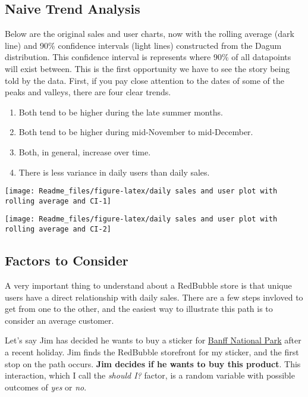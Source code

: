 \documentclass[]{article}
\providecommand{\tightlist}{%
  \setlength{\itemsep}{0pt}\setlength{\parskip}{0pt}}
\begin{document}
\subsection{Naive Trend Analysis}\label{naive-trend-analysis}

Below are the original sales and user charts, now with the rolling
average (dark line) and 90\% confidence intervals (light lines)
constructed from the Dagum distribution. This confidence interval is
represents where 90\% of all datapoints will exist between. This is the
first opportunity we have to see the story being told by the data.
First, if you pay close attention to the dates of some of the peaks and
valleys, there are four clear trends.

\begin{enumerate}
\def\labelenumi{\arabic{enumi}.}
\tightlist
\item
  Both tend to be higher during the late summer months.
\item
  Both tend to be higher during mid-November to mid-December.
\item
  Both, in general, increase over time.
\item
  There is less variance in daily users than daily sales.
\end{enumerate}

\begin{center}\texttt{[image: Readme\_files/figure-latex/daily sales and user plot with rolling average and CI-1]} \end{center}

\begin{center}\texttt{[image: Readme\_files/figure-latex/daily sales and user plot with rolling average and CI-2]} \end{center}

\subsection{Factors to Consider}\label{factors-to-consider}

A very important thing to understand about a RedBubble store is that
unique users have a direct relationship with daily sales. There are a
few steps invloved to get from one to the other, and the easiest way to
illustrate this path is to consider an average customer.

Let's say Jim has decided he wants to buy a sticker for
\href{https://www.redbubble.com/people/tysonk/works/33710123-banff-national-park-basic?asc=u\&p=sticker}{Banff
National Park} after a recent holiday. Jim finds the RedBubble
storefront for my sticker, and the first stop on the path occurs.
\textbf{Jim decides if he wants to buy this product}. This interaction,
which I call the \emph{should I?} factor, is a random variable with
possible outcomes of \emph{yes} or \emph{no}.
\end{document}

